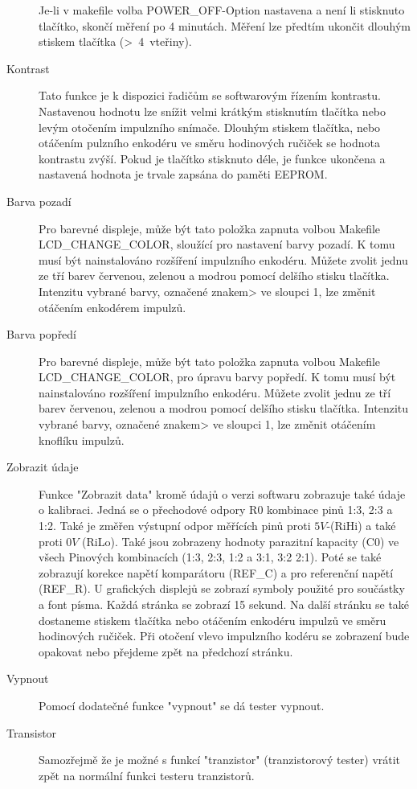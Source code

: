 \begin{description}
Je-li v makefile volba POWER\_OFF-Option nastavena a není li stisknuto tlačítko,
skončí měření po 4 minutách.
Měření lze předtím ukončit dlouhým stiskem tlačítka (\textgreater~4~vteřiny).
\item[Kontrast] 
Tato funkce je k dispozici řadičům se softwarovým řízením kontrastu.
Nastavenou hodnotu lze snížit velmi krátkým stisknutím tlačítka nebo levým otočením impulzního snímače.
Dlouhým stiskem tlačítka, nebo otáčením pulzního enkodéru ve směru hodinových ručiček
se hodnota kontrastu zvýší.
Pokud je tlačítko stisknuto déle, je funkce ukončena a nastavená hodnota je trvale zapsána do paměti EEPROM.
\item[Barva pozadí]
Pro barevné displeje, může být tato položka zapnuta volbou Makefile\\ LCD\_CHANGE\_COLOR,
sloužící pro nastavení barvy pozadí. K tomu musí být nainstalováno rozšíření impulzního enkodéru.
Můžete zvolit jednu ze tří barev červenou, zelenou a modrou pomocí delšího stisku tlačítka.
Intenzitu vybrané barvy, označené znakem> ve sloupci 1,
lze změnit otáčením enkodérem impulzů.
\item[Barva popředí]
Pro barevné displeje, může být tato položka zapnuta volbou Makefile\\ LCD\_CHANGE\_COLOR,
pro úpravu barvy popředí. K tomu musí být nainstalováno rozšíření impulzního enkodéru.
Můžete zvolit jednu ze tří barev červenou, zelenou a modrou pomocí delšího stisku tlačítka.
Intenzitu vybrané barvy, označené znakem> ve sloupci 1,
lze změnit otáčením knoflíku impulzů.
\item[Zobrazit údaje]
Funkce "Zobrazit data" kromě údajů o verzi softwaru zobrazuje také údaje o kalibraci.
Jedná se o přechodové odpory R0  kombinace pinů 1:3, 2:3 a 1:2.
Také je změřen výstupní odpor měřících pinů proti \(5V\)-(RiHi) a také proti \(0V\) (RiLo).
Také jsou zobrazeny hodnoty parazitní kapacity (C0) ve všech Pinových kombinacích (1:3, 2:3, 1:2 a 3:1, 3:2 2:1).
Poté se také zobrazují korekce napětí komparátoru (REF\_C) a pro referenční napětí (REF\_R).
U grafických displejů se zobrazí symboly použité pro součástky a font písma.
Každá stránka se zobrazí 15 sekund.
Na další stránku se také dostaneme stiskem tlačítka nebo otáčením enkodéru impulzů ve směru hodinových ručiček.
Při otočení vlevo impulzního kodéru se zobrazení bude opakovat nebo přejdeme zpět na předchozí stránku.
 \item[Vypnout]
Pomocí dodatečné funkce "vypnout" se dá tester vypnout.
 \item[Transistor]
Samozřejmě že je možné s funkcí "tranzistor" (tranzistorový tester) vrátit zpět na
normální funkci testeru tranzistorů.
\end{description}

